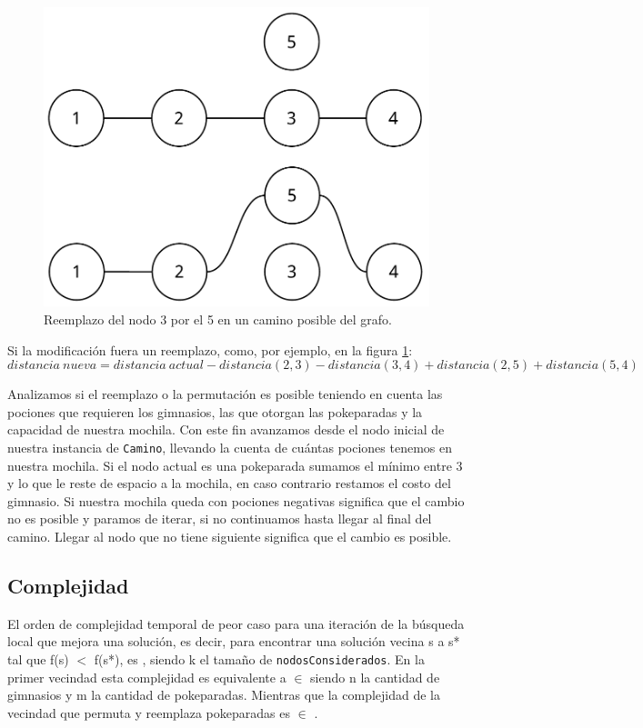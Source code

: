 \begin{figure}[H]
  \begin{center}
    \includegraphics[scale = 0.5]{imagenes/ej3_algoritmo_2.pdf}
    \caption{Reemplazo del nodo 3 por el 5 en un camino posible del grafo.}
    \label{fig:ej3_algoritmo_2}
  \end{center}
\end{figure}

Si la modificaci\'on fuera un reemplazo, como, por ejemplo, en la figura \ref{fig:ej3_algoritmo_2}:
\begin{equation*}
distancia\ nueva = distancia\ actual - distancia(2,3) - distancia(3,4) + distancia(2,5) + distancia(5,4)
\end{equation*}

Analizamos si el reemplazo o la permutaci\'on es posible teniendo en cuenta las pociones que requieren los gimnasios, las que otorgan las pokeparadas y la capacidad de nuestra mochila. Con este fin avanzamos desde el nodo inicial de nuestra instancia de \texttt{Camino}, llevando la cuenta de cu\'antas pociones tenemos en nuestra mochila. Si el nodo actual es una pokeparada sumamos el m\'inimo entre 3 y lo que le reste de espacio a la mochila, en caso contrario restamos el costo del gimnasio. Si nuestra mochila queda con pociones negativas significa que el cambio no es posible y paramos de iterar, si no continuamos hasta llegar al final del camino. Llegar al nodo que no tiene siguiente significa que el cambio es posible.

\subsection{Complejidad}
El orden de complejidad temporal de peor caso para una iteraci\'on de la b\'usqueda local que mejora una soluci\'on, es decir, para encontrar una soluci\'on vecina s a s* tal que f(s) $<$ f(s*), es , siendo k el tamaño de \texttt{nodosConsiderados}. En la primer vecindad esta complejidad es equivalente a  $\in$  siendo n la cantidad de gimnasios y m la cantidad de pokeparadas. Mientras que la complejidad de la vecindad que permuta y reemplaza pokeparadas es  $\in$ .

